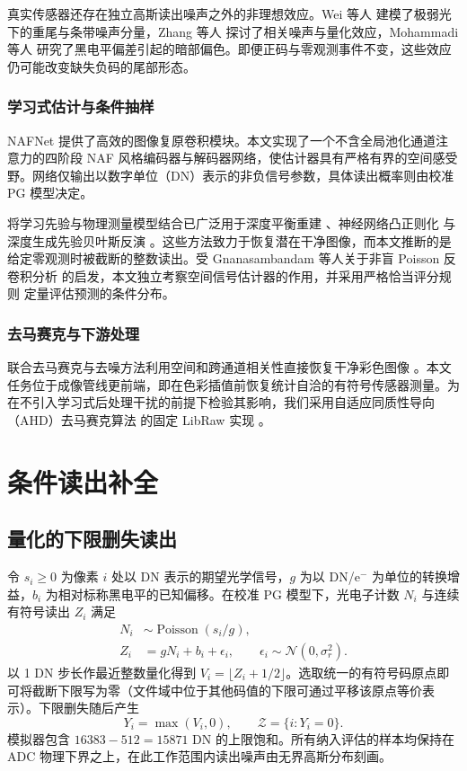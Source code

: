 \documentclass[10pt,twocolumn,journal]{IEEEtran}
\begin{document}
真实传感器还存在独立高斯读出噪声之外的非理想效应。Wei 等人 \cite{wei2020} 建模了极弱光下的重尾与条带噪声分量，Zhang 等人 \cite{zhang2021} 探讨了相关噪声与量化效应，Mohammadi 等人 \cite{mohammadi2026} 研究了黑电平偏差引起的暗部偏色。即便正码与零观测事件不变，这些效应仍可能改变缺失负码的尾部形态。

\subsubsection{学习式估计与条件抽样}
NAFNet \cite{nafnet} 提供了高效的图像复原卷积模块。本文实现了一个不含全局池化通道注意力的四阶段 NAF 风格编码器与解码器网络，使估计器具有严格有界的空间感受野。网络仅输出以数字单位（DN）表示的非负信号参数，具体读出概率则由校准 PG 模型决定。

将学习先验与物理测量模型结合已广泛用于深度平衡重建 \cite{gilton2021}、神经网络凸正则化 \cite{goujon2023} 与深度生成先验贝叶斯反演 \cite{bohra2022}。这些方法致力于恢复潜在干净图像，而本文推断的是给定零观测时被截断的整数读出。受 Gnanasambandam 等人关于非盲 Poisson 反卷积分析 \cite{gnanasambandam2024} 的启发，本文独立考察空间信号估计器的作用，并采用严格恰当评分规则 \cite{gneiting2007} 定量评估预测的条件分布。

\subsubsection{去马赛克与下游处理}
联合去马赛克与去噪方法利用空间和跨通道相关性直接恢复干净彩色图像 \cite{gharbi2016}。本文任务位于成像管线更前端，即在色彩插值前恢复统计自洽的有符号传感器测量。为在不引入学习式后处理干扰的前提下检验其影响，我们采用自适应同质性导向（AHD）去马赛克算法 \cite{hirakawa2005} 的固定 LibRaw 实现 \cite{libraw}。

\section{条件读出补全}
\subsection{量化的下限删失读出}
令 $s_i\geq0$ 为像素 $i$ 处以 DN 表示的期望光学信号，$g$ 为以 DN/e$^{-}$ 为单位的转换增益，$b_i$ 为相对标称黑电平的已知偏移。在校准 PG 模型下，光电子计数 $N_i$ 与连续有符号读出 $Z_i$ 满足
\begin{align}
N_i&\sim\operatorname{Poisson}(s_i/g),\label{eq:pois}\\
Z_i&=gN_i+b_i+\epsilon_i,\qquad \epsilon_i\sim\mathcal N(0,\sigma_r^2).\label{eq:forward}
\end{align}
以 1 DN 步长作最近整数量化得到 $V_i=\lfloor Z_i+1/2\rfloor$。选取统一的有符号码原点即可将截断下限写为零（文件域中位于其他码值的下限可通过平移该原点等价表示）。下限删失随后产生
\begin{equation}
Y_i=\max(V_i,0),\qquad \mathcal Z=\{i:Y_i=0\}.\label{eq:censor}
\end{equation}
模拟器包含 $16383-512=15871$ DN 的上限饱和。所有纳入评估的样本均保持在 ADC 物理下界之上，在此工作范围内读出噪声由无界高斯分布刻画。
\end{document}
